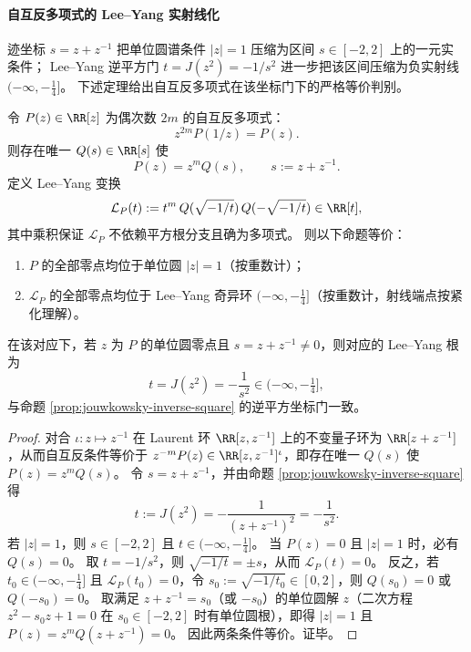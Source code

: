 \paragraph{自互反多项式的 Lee--Yang 实射线化}
迹坐标 \(s=z+z^{-1}\) 把单位圆谱条件 \(|z|=1\) 压缩为区间 \(s\in[-2,2]\) 上的一元实条件；
Lee--Yang 逆平方门 \(t=J(z^2)=-1/s^2\) 进一步把该区间压缩为负实射线 \((-\infty,-\tfrac14]\)。
下述定理给出自互反多项式在该坐标门下的严格等价判别。

\begin{theorem}\label{thm:leyang-selfreciprocal-ray-criterion}
令 \(P(z)\in\RR[z]\) 为偶次数 \(2m\) 的自互反多项式：
\[
z^{2m}P(1/z)=P(z).
\]
则存在唯一 \(Q(s)\in\RR[s]\) 使
\[
P(z)=z^{m}Q(s),\qquad s:=z+z^{-1}.
\]
定义 Lee--Yang 变换
\[
\mathcal L_P(t):=t^{m}\,Q(\sqrt{-1/t})\,Q(-\sqrt{-1/t})\in\RR[t],
\]
其中乘积保证 \(\mathcal L_P\) 不依赖平方根分支且确为多项式。
则以下命题等价：
\begin{enumerate}
  \item \(P\) 的全部零点均位于单位圆 \(|z|=1\)（按重数计）；
  \item \(\mathcal L_P\) 的全部零点均位于 Lee--Yang 奇异环 \((-\infty,-\tfrac14]\)（按重数计，射线端点按紧化理解）。
\end{enumerate}
在该对应下，若 \(z\) 为 \(P\) 的单位圆零点且 \(s=z+z^{-1}\neq 0\)，则对应的 Lee--Yang 根为
\[
t=J(z^2)=-\frac{1}{s^2}\in(-\infty,-\tfrac14],
\]
与命题 \ref{prop:jouwkowsky-inverse-square} 的逆平方坐标门一致。
\end{theorem}
\begin{proof}
对合 \(\iota:z\mapsto z^{-1}\) 在 Laurent 环 \(\RR[z,z^{-1}]\) 上的不变量子环为 \(\RR[z+z^{-1}]\)，从而自互反条件等价于 \(z^{-m}P(z)\in \RR[z,z^{-1}]^{\iota}\)，即存在唯一 \(Q(s)\) 使 \(P(z)=z^{m}Q(s)\)。
令 \(s=z+z^{-1}\)，并由命题 \ref{prop:jouwkowsky-inverse-square} 得
\[
t:=J(z^2)=-\frac{1}{(z+z^{-1})^2}=-\frac{1}{s^2}.
\]
若 \(|z|=1\)，则 \(s\in[-2,2]\) 且 \(t\in(-\infty,-\tfrac14]\)。
当 \(P(z)=0\) 且 \(|z|=1\) 时，必有 \(Q(s)=0\)。
取 \(t=-1/s^2\)，则 \(\sqrt{-1/t}=\pm s\)，从而 \(\mathcal L_P(t)=0\)。
反之，若 \(t_0\in(-\infty,-\tfrac14]\) 且 \(\mathcal L_P(t_0)=0\)，令 \(s_0:=\sqrt{-1/t_0}\in[0,2]\)，则 \(Q(s_0)=0\) 或 \(Q(-s_0)=0\)。
取满足 \(z+z^{-1}=s_0\)（或 \(-s_0\)）的单位圆解 \(z\)（二次方程 \(z^2-s_0z+1=0\) 在 \(s_0\in[-2,2]\) 时有单位圆根），即得 \(|z|=1\) 且 \(P(z)=z^{m}Q(z+z^{-1})=0\)。
因此两条条件等价。证毕。
\end{proof}

